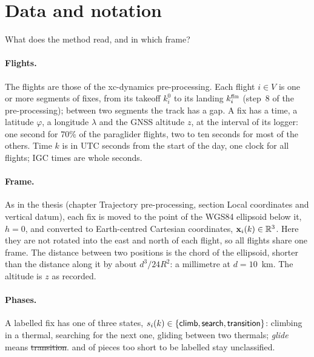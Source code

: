 \section{Data and notation}\label{sec:data}

What does the method read, and in which frame?

\paragraph{Flights.} The flights are those of the xc-dynamics pre-processing. Each flight
$i\in V$ is one or more segments of fixes, from its takeoff $k^0_i$ to its landing $k^{\mathrm{fin}}_i$
(step~8 of the pre-processing); between two segments the track has a gap. A fix has a time, a latitude $\varphi$, a longitude $\lambda$ and the GNSS altitude
$z$, at the interval of its logger: one second for 70\% of the paraglider flights, two to ten
seconds for most of the others. Time $k$ is in UTC seconds from the start of the day, one clock
for all flights; IGC times are whole seconds.

\paragraph{Frame.} As in the thesis (chapter Trajectory pre-processing, section Local coordinates
and vertical datum), each fix is moved to the point of the WGS84 ellipsoid below it, $h=0$, and
converted to Earth-centred Cartesian coordinates, $\mathbf{x}_i(k)\in\mathbb{R}^3$. Here they are not rotated into
the east and north of each flight, so all flights share one frame. The distance between two
positions is the chord of the ellipsoid, shorter than the distance along it by about
$d^3/24R^2$: a millimetre at $d=10$~km. The altitude is $z$ as recorded.

\paragraph{Phases.}  A labelled fix has one of three states,
$s_i(k)\in\{\textsf{climb}, \textsf{search}, \textsf{transition}\}$: climbing in a thermal, searching for the
next one, gliding between two thermals; \emph{glide} means \st{transition}.  and of pieces too short to be labelled stay unclassified.

